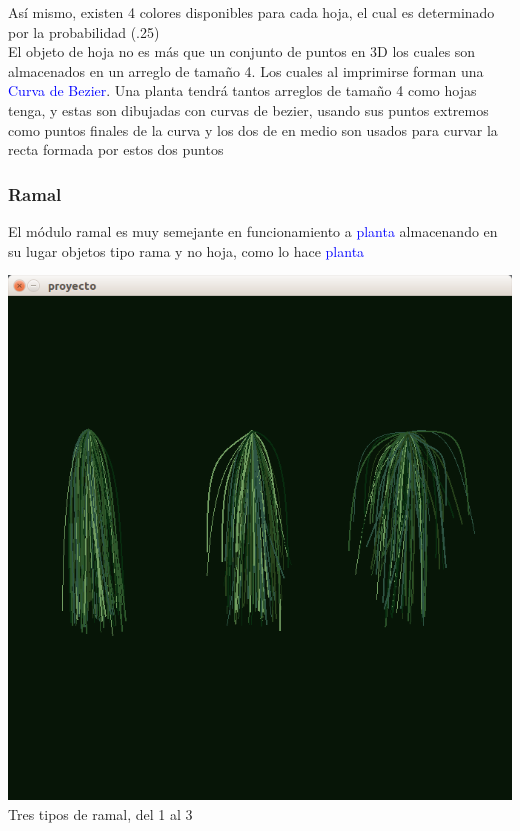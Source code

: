 \documentclass[11pt,a4paper]{article}
\begin{document}
			Así mismo, existen 4 colores disponibles para cada hoja, el cual es determinado por la probabilidad (.25)\\ 
			El objeto de hoja no es más que un conjunto de puntos en 3D los cuales son almacenados en un arreglo de tamaño 4. Los cuales al imprimirse forman una \textcolor{blue}{Curva de Bezier}. Una planta tendrá tantos arreglos de tamaño 4 como hojas tenga, y estas son dibujadas con curvas de bezier, usando sus puntos extremos como puntos finales de la curva y los dos de en medio son usados para curvar la recta formada por estos dos puntos

			\subsubsection{Ramal}

			El módulo ramal es muy semejante en funcionamiento a \textcolor{blue}{planta} almacenando en su lugar objetos tipo rama y no hoja, como lo hace \textcolor{blue}{planta}

			\begin{center}
			\includegraphics[scale=.4]{CAP9}\\
			{\tiny Tres tipos de ramal, del 1 al 3}
			\end{center}
\end{document}
